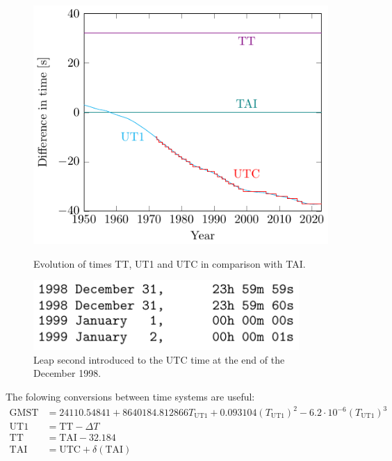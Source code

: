 \documentclass[../main.tex]{subfiles}
\begin{document}
\begin{figure}[htbp]
  \centering
  \begin{minipage}[t]{0.45\textwidth}
    \centering
    \includegraphics[width=\textwidth]{Images/graph_time.pdf}
    \caption{Evolution of times TT, UT1 and UTC in comparison with TAI. \cite{iersDeltaT}}
    \label{fig:graph_time}
  \end{minipage}
  \hfill
  \begin{minipage}[ht]{0.45\textwidth}
    \centering
    \includegraphics[width=0.9\textwidth]{Images/leap_second.pdf}
    \caption{Leap second introduced to the UTC time at the end of the December 1998. \cite{iersbulletinC}}
    \label{fig:leapsecond}
  \end{minipage}
\end{figure}
The folowing conversions between time systems are useful:
\begin{align*}
  \text{GMST} & =24110.54841+8640184.812866{T_\text{UT1}}+0.093104{(T_\text{UT1})}^2-6.2\cdot 10^{-6}{(T_\text{UT1})}^3 \\
  \text{UT1}  & =\text{TT}-\Delta T                                                                                     \\
  \text{TT}   & =\text{TAI}-32.184                                                                                      \\
  \text{TAI}  & =\text{UTC}+\delta(\text{TAI})
\end{align*}
\end{document}
